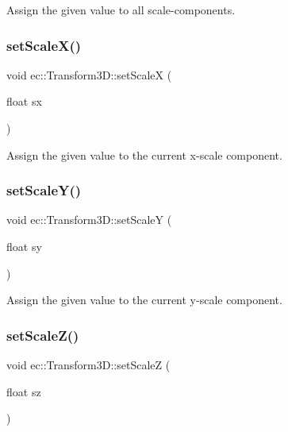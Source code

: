 Assign the given value to all scale-\/components. \mbox{\label{classec_1_1_transform3_d_ada2c6aded239ad20e1c155a5dee60506}} 
\subsubsection{\texorpdfstring{set\+Scale\+X()}{setScaleX()}}
{\footnotesize\ttfamily void ec\+::\+Transform3\+D\+::set\+ScaleX (\begin{DoxyParamCaption}\item[{float}]{sx }\end{DoxyParamCaption})}

Assign the given value to the current x-\/scale component. \mbox{\label{classec_1_1_transform3_d_a599ea97d84a88467abec94a30339f73e}} 
\subsubsection{\texorpdfstring{set\+Scale\+Y()}{setScaleY()}}
{\footnotesize\ttfamily void ec\+::\+Transform3\+D\+::set\+ScaleY (\begin{DoxyParamCaption}\item[{float}]{sy }\end{DoxyParamCaption})}

Assign the given value to the current y-\/scale component. \mbox{\label{classec_1_1_transform3_d_a1a71c829c953e5585623696fd7a4624d}} 
\subsubsection{\texorpdfstring{set\+Scale\+Z()}{setScaleZ()}}
{\footnotesize\ttfamily void ec\+::\+Transform3\+D\+::set\+ScaleZ (\begin{DoxyParamCaption}\item[{float}]{sz }\end{DoxyParamCaption})}

